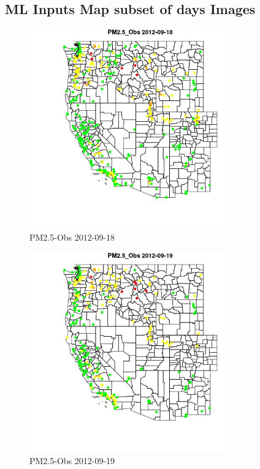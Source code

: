 
\subsection{ML Inputs Map subset of days Images} 
 

\begin{figure} 
\centering  
\includegraphics[width=0.77\textwidth]{Code_Outputs/ML_input_report_ML_input_PM25_Step5_part_d_de_duplicated_aves_ML_input_MapObsPM25_Obs2012-09-18.jpg} 
\caption{\label{fig:ML_input_report_ML_input_PM25_Step5_part_d_de_duplicated_aves_ML_inputMapObsPM25_Obs2012-09-18}PM2.5-Obs 2012-09-18} 
\end{figure} 
 

\begin{figure} 
\centering  
\includegraphics[width=0.77\textwidth]{Code_Outputs/ML_input_report_ML_input_PM25_Step5_part_d_de_duplicated_aves_ML_input_MapObsPM25_Obs2012-09-19.jpg} 
\caption{\label{fig:ML_input_report_ML_input_PM25_Step5_part_d_de_duplicated_aves_ML_inputMapObsPM25_Obs2012-09-19}PM2.5-Obs 2012-09-19} 
\end{figure} 
 

